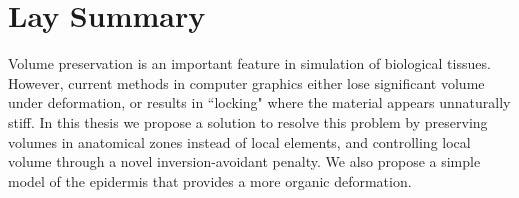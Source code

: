 

\chapter{Lay Summary}

Volume preservation is an important feature in simulation of biological tissues.
However, current methods in computer graphics either lose significant volume under deformation, or results in ``locking" where the material appears unnaturally stiff.
In this thesis we propose a solution to resolve this problem by preserving volumes in anatomical zones instead of local elements, and controlling local volume through a novel inversion-avoidant penalty.
We also propose a simple model of the epidermis that provides a more organic deformation.
